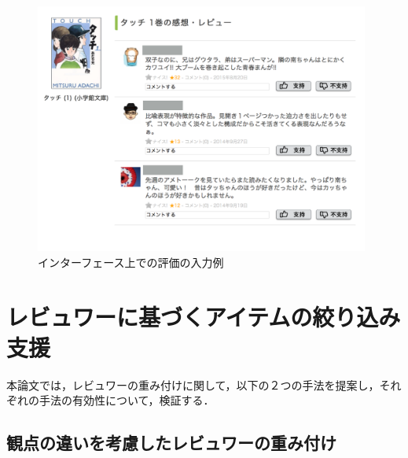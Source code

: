 \documentclass[a4paper,11pt,oneside,openany]{jsbook}
\begin{document}
\begin{figure}[tb]
	\begin{center} %
		\includegraphics[width = 110mm]{figures/feedback_image.pdf} %
	\end{center}
	\caption{インターフェース上での評価の入力例} %
	\label{fig:feedback_image} %
\end{figure}




\chapter{レビュワーに基づくアイテムの絞り込み支援}
本論文では，レビュワーの重み付けに関して，以下の２つの手法を提案し，それぞれの手法の有効性について，検証する．
	\section{観点の違いを考慮したレビュワーの重み付け}
	\label{sec:viewpoint_weight}
\end{document}
